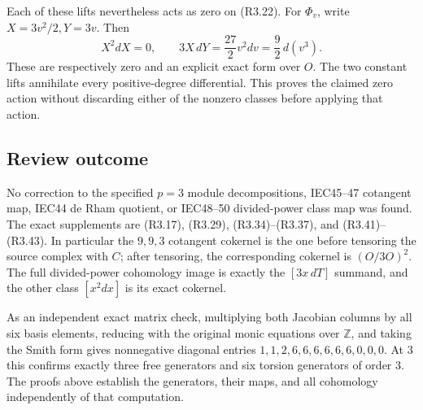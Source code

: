 \documentclass[
]{article}
\begin{document}
Each of these lifts nevertheless acts as zero on (R3.22). For
\(\Phi_v\), write \(X=3v^2/2,Y=3v\). Then \[
X^2dX=0,\qquad
3X\,dY=\frac{27}{2}v^2dv=\frac92\,d(v^3).
\] These are respectively zero and an explicit exact form over \(O\).
The two constant lifts annihilate every positive-degree differential.
This proves the claimed zero action without discarding either of the
nonzero classes before applying that action.

\subsection{Review outcome}\label{review-outcome}

No correction to the specified \(p=3\) module decompositions, IEC45--47
cotangent map, IEC44 de Rham quotient, or IEC48--50 divided-power class
map was found. The exact supplements are (R3.17), (R3.29),
(R3.34)--(R3.37), and (R3.41)--(R3.43). In particular the \(9,9,3\)
cotangent cokernel is the one before tensoring the source complex with
\(C\); after tensoring, the corresponding cokernel is \((O/3O)^2\). The
full divided-power cohomology image is exactly the \([3x\,dT]\) summand,
and the other class \([x^2dx]\) is its exact cokernel.

As an independent exact matrix check, multiplying both Jacobian columns
by all six basis elements, reducing with the original monic equations
over \(\mathbb Z\), and taking the Smith form gives nonnegative diagonal
entries \(1,1,2,6,6,6,6,6,6,0,0,0\). At 3 this confirms exactly three
free generators and six torsion generators of order 3. The proofs above
establish the generators, their maps, and all cohomology independently
of that computation.
\end{document}
